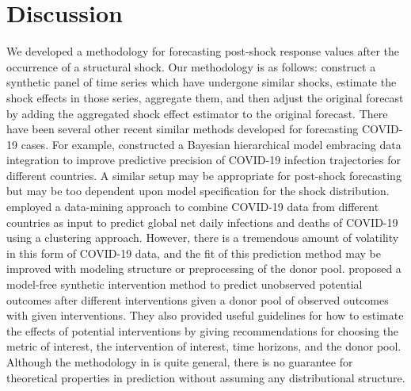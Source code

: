 \documentclass[11pt]{article}
\theoremstyle{definition}
\begin{document}
\section{Discussion}
\label{discussion}

We developed a methodology for forecasting post-shock response values after the occurrence of a structural shock. Our methodology is as follows: construct a synthetic panel of time series which have undergone similar shocks, estimate the shock effects in those series, aggregate them, and then adjust the original forecast by adding the aggregated shock effect estimator to the original forecast. There have been several other recent similar methods developed for forecasting COVID-19 cases. For example, \citet{lee2020estimation} constructed a Bayesian hierarchical model embracing data integration to improve predictive precision of COVID-19 infection trajectories for different countries. A similar setup may be appropriate for post-shock forecasting but may be too dependent upon model specification for the shock distribution. \citet{plessen2020integrated} employed a data-mining approach to combine COVID-19 data from different countries as input to predict global net daily infections and deaths of COVID-19 using a clustering approach. However, there is a tremendous amount of volatility in this form of COVID-19 data, and the fit of this prediction method may be improved with modeling structure or preprocessing of the donor pool. \citet{agarwal2020two} proposed a model-free synthetic intervention method to predict unobserved potential outcomes after different interventions given a donor pool of observed outcomes with given interventions. They also provided useful guidelines for how to estimate the effects of potential interventions by giving recommendations for choosing the metric of interest, the intervention of interest, time horizons, and the donor pool. Although the methodology in \citet{agarwal2020two} is quite general, there is no guarantee for theoretical properties in prediction without assuming any distributional structure. 
\end{document}
